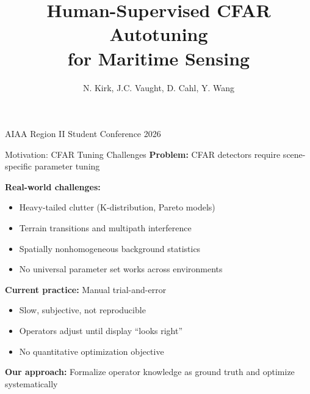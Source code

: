 \documentclass[aspectratio=169, 10pt]{beamer}
\title{Human-Supervised CFAR Autotuning\\for Maritime Sensing}
\author{N. Kirk, J.C. Vaught, D. Cahl, Y. Wang}
\institute{University of South Carolina\\Columbia, SC 29208}
\date{}
\begin{document}
{
\begin{frame}[plain]
    \vspace{1.5cm}
    {\color{white}\Huge\inserttitle}

    \vspace{1cm}
    {\color{white}\large\insertauthor}

    \vspace{0.5cm}
    {\color{white}\insertinstitute}

    \vspace{1cm}
    {\color{Black10}\small AIAA Region II Student Conference 2026}
\end{frame}
}

\begin{frame}{Motivation: CFAR Tuning Challenges}
\small
\textbf{Problem:} CFAR detectors require scene-specific parameter tuning
\vspace{0.3cm}

\textbf{Real-world challenges:}
\begin{itemize}
    \item Heavy-tailed clutter (K-distribution, Pareto models)
    \item Terrain transitions and multipath interference
    \item Spatially nonhomogeneous background statistics
    \item No universal parameter set works across environments
\end{itemize}

\vspace{0.3cm}
\textbf{Current practice:} Manual trial-and-error
\begin{itemize}
    \item Slow, subjective, not reproducible
    \item Operators adjust until display ``looks right''
    \item No quantitative optimization objective
\end{itemize}

\vspace{0.3cm}
\alert{\textbf{Our approach:}} Formalize operator knowledge as ground truth and optimize systematically
\end{frame}
\end{document}
